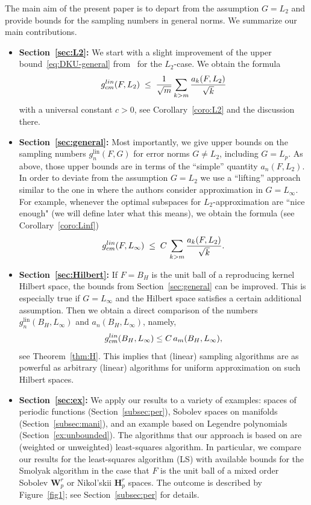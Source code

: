 \documentclass[a4paper,12pt]{amsart}
\theoremstyle{definition}
\theoremstyle{remark}
\newcommand{\lin}{\ensuremath{\mathrm{lin}}}
\begin{document}
The main aim of the present paper is to depart from the assumption $G=L_2$ and provide bounds for the sampling numbers in general norms.
We summarize our main contributions.
\begin{itemize}[leftmargin=*]
    \item   \textbf{Section~\ref{sec:L2}:}  We start with a slight improvement of the upper bound~\eqref{eq:DKU-general} from~\cite{DKU} for the $L_2$-case. 
    We obtain the formula
    \[
g_{cm}^{\rm lin}(F,L_2) 
\;\le\; \frac{1}{\sqrt{m}}\sum_{k > m} \frac{ a_k(F,L_2)}{\sqrt{k}}
\]
 with a universal constant $c>0$,     see Corollary~\ref{coro:L2}
    and the discussion there.
    \medskip
    
    \item \textbf{Section~\ref{sec:general}:}  Most importantly, we give upper bounds on the sampling numbers $g_{n}^\lin(F,G)$ for error norms $G\ne L_2$, including %
    $G=L_p$. %
    As above, those upper bounds are in terms of the ``simple'' quantity $a_n(F,L_2)$.
    In order to deviate from the assumption $G=L_2$ we use a ``lifting'' approach similar to the one in \cite{PU} where the authors consider approximation in $G=L_\infty$.
    For example,
    whenever the optimal subspaces for $L_2$-approximation are ``nice enough" (we will define later what this means), we obtain the formula
 (see Corollary~\ref{coro:Linf})
 \[
    g_{cm}^{\rm lin}(F,L_\infty) 
    \;\le\; C \, \sum_{k > m} \frac{ a_k(F,L_2)}{\sqrt{k}}.
    \]
   
        \medskip

    \item \textbf{Section~\ref{sec:Hilbert}:} If $F=B_H$ is the unit ball of a reproducing kernel Hilbert space, 
    the bounds from Section~\ref{sec:general} can be improved.
    This is especially true if $G=L_\infty$ and the Hilbert space satisfies a certain additional assumption. Then we obtain a direct comparison of the numbers $g_{n}^\lin(B_H,L_\infty)$ and $a_n(B_H,L_\infty)$, namely,
    \[
     g_{cm}^{\rm lin}(B_H,L_\infty)
     \le C\, a_m(B_H,L_\infty),
    \]
    see Theorem~\ref{thm:H}.
    This implies that (linear) sampling algorithms are as powerful as arbitrary (linear) algorithms for uniform approximation
    on such Hilbert spaces.
          \medskip

    \item \textbf{Section~\ref{sec:ex}:} We apply our results to a variety of examples: %
    spaces of periodic functions (Section~\ref{subsec:per}),
    Sobolev spaces on manifolds (Section~\ref{subsec:mani}),
    and an example based on Legendre polynomials (Section~\ref{ex:unbounded}).
    The algorithms that our approach is based on are (weighted or unweighted) least-squares algorithm.
         {In particular,}
    we compare our results for the least-squares algorithm (LS) with available bounds for the Smolyak algorithm in the case that $F$ is the unit ball of a mixed order Sobolev 
    {$\mathbf{W}^r_p$}
    {or Nikol'skii $\mathbf{H}^r_p$ spaces.
    The outcome is described by Figure~\ref{fig1}; see Section~\ref{subsec:per} for details.}
\end{itemize}
          
\end{document}
